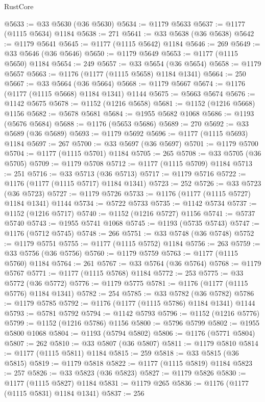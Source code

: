 \begin{lexlean}{RustCore}
\begin{coremodule}
@5633 := @33 @5630 (@36 @5630)
@5634 := @1179 @5633
@5637 := @1177 (@1115 @5634) @1184
@5638 := 271
@5641 := @33 @5638 (@36 @5638)
@5642 := @1179 @5641
@5645 := @1177 (@1115 @5642) @1184
@5646 := 269
@5649 := @33 @5646 (@36 @5646)
@5650 := @1179 @5649
@5653 := @1177 (@1115 @5650) @1184
@5654 := 249
@5657 := @33 @5654 (@36 @5654)
@5658 := @1179 @5657
@5663 := @1176 (@1177 (@1115 @5658) @1184 @1341)
@5664 := 250
@5667 := @33 @5664 (@36 @5664)
@5668 := @1179 @5667
@5674 := @1176 (@1177 (@1115 @5668) @1184 @1341) @1144
@5675 := @5663 @5674
@5676 := @1142 @5675
@5678 := @1152 (@1216 @5658)
@5681 := @1152 (@1216 @5668) @1156
@5682 := @5678 @5681
@5684 := @1955 @5682 @1068
@5686 := @1193 (@5676 @5684)
@5688 := @1176 (@5653 @5686)
@5689 := 270
@5692 := @33 @5689 (@36 @5689)
@5693 := @1179 @5692
@5696 := @1177 (@1115 @5693) @1184
@5697 := 267
@5700 := @33 @5697 (@36 @5697)
@5701 := @1179 @5700
@5704 := @1177 (@1115 @5701) @1184
@5705 := 265
@5708 := @33 @5705 (@36 @5705)
@5709 := @1179 @5708
@5712 := @1177 (@1115 @5709) @1184
@5713 := 251
@5716 := @33 @5713 (@36 @5713)
@5717 := @1179 @5716
@5722 := @1176 (@1177 (@1115 @5717) @1184 @1341)
@5723 := 252
@5726 := @33 @5723 (@36 @5723)
@5727 := @1179 @5726
@5733 := @1176 (@1177 (@1115 @5727) @1184 @1341) @1144
@5734 := @5722 @5733
@5735 := @1142 @5734
@5737 := @1152 (@1216 @5717)
@5740 := @1152 (@1216 @5727) @1156
@5741 := @5737 @5740
@5743 := @1955 @5741 @1068
@5745 := @1193 (@5735 @5743)
@5747 := @1176 (@5712 @5745)
@5748 := 266
@5751 := @33 @5748 (@36 @5748)
@5752 := @1179 @5751
@5755 := @1177 (@1115 @5752) @1184
@5756 := 263
@5759 := @33 @5756 (@36 @5756)
@5760 := @1179 @5759
@5763 := @1177 (@1115 @5760) @1184
@5764 := 261
@5767 := @33 @5764 (@36 @5764)
@5768 := @1179 @5767
@5771 := @1177 (@1115 @5768) @1184
@5772 := 253
@5775 := @33 @5772 (@36 @5772)
@5776 := @1179 @5775
@5781 := @1176 (@1177 (@1115 @5776) @1184 @1341)
@5782 := 254
@5785 := @33 @5782 (@36 @5782)
@5786 := @1179 @5785
@5792 := @1176 (@1177 (@1115 @5786) @1184 @1341) @1144
@5793 := @5781 @5792
@5794 := @1142 @5793
@5796 := @1152 (@1216 @5776)
@5799 := @1152 (@1216 @5786) @1156
@5800 := @5796 @5799
@5802 := @1955 @5800 @1068
@5804 := @1193 (@5794 @5802)
@5806 := @1176 (@5771 @5804)
@5807 := 262
@5810 := @33 @5807 (@36 @5807)
@5811 := @1179 @5810
@5814 := @1177 (@1115 @5811) @1184
@5815 := 259
@5818 := @33 @5815 (@36 @5815)
@5819 := @1179 @5818
@5822 := @1177 (@1115 @5819) @1184
@5823 := 257
@5826 := @33 @5823 (@36 @5823)
@5827 := @1179 @5826
@5830 := @1177 (@1115 @5827) @1184
@5831 := @1179 @265
@5836 := @1176 (@1177 (@1115 @5831) @1184 @1341)
@5837 := 256

\end{coremodule}
\end{lexlean}
